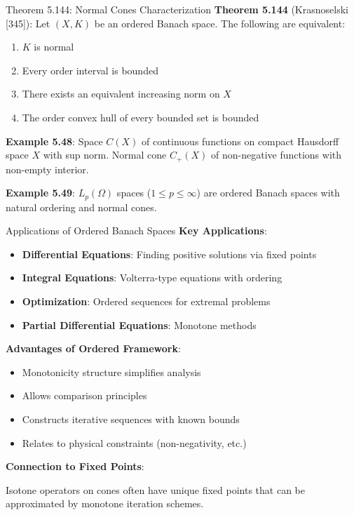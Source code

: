 \documentclass[aspectratio=169,10pt]{beamer}
\begin{document}
\begin{frame}{Theorem 5.144: Normal Cones Characterization}
    \textbf{Theorem 5.144} (Krasnoselski [345]): Let $(X, K)$ be an ordered Banach space. The following are equivalent:
    \begin{enumerate}
        \item $K$ is normal
        \item Every order interval is bounded
        \item There exists an equivalent increasing norm on $X$
        \item The order convex hull of every bounded set is bounded
    \end{enumerate}

    \medskip

    \textbf{Example 5.48}: Space $C(X)$ of continuous functions on compact Hausdorff space $X$ with sup norm. Normal cone $C_+(X)$ of non-negative functions with non-empty interior.

    \medskip

    \textbf{Example 5.49}: $L_p(\Omega)$ spaces ($1 \leq p \leq \infty$) are ordered Banach spaces with natural ordering and normal cones.
\end{frame}

\begin{frame}{Applications of Ordered Banach Spaces}
    \textbf{Key Applications}:
    \begin{itemize}
        \item \textbf{Differential Equations}: Finding positive solutions via fixed points
        \item \textbf{Integral Equations}: Volterra-type equations with ordering
        \item \textbf{Optimization}: Ordered sequences for extremal problems
        \item \textbf{Partial Differential Equations}: Monotone methods
    \end{itemize}

    \medskip

    \textbf{Advantages of Ordered Framework}:
    \begin{itemize}
        \item Monotonicity structure simplifies analysis
        \item Allows comparison principles
        \item Constructs iterative sequences with known bounds
        \item Relates to physical constraints (non-negativity, etc.)
    \end{itemize}

    \medskip

    \textbf{Connection to Fixed Points}:

    Isotone operators on cones often have unique fixed points that can be approximated by monotone iteration schemes.
\end{frame}
\end{document}
